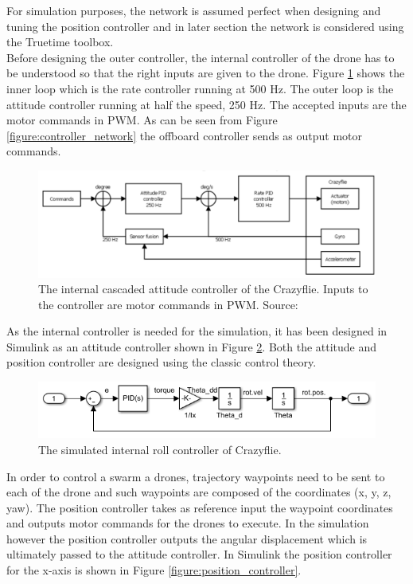 For simulation purposes, the network is assumed perfect when designing and tuning the position controller and in later section the network is considered using the Truetime toolbox.\\

Before designing the outer controller, the internal controller of the drone has to be understood so that the right inputs are given to the drone. Figure \ref{figure:internal_controller} shows the inner loop which is the rate controller running at 500 Hz. The outer loop is the attitude controller running at half the speed, 250 Hz. The accepted inputs are the motor commands in PWM. As can be seen from Figure \ref{figure:controller_network} the offboard controller sends as output motor commands.

\begin{figure}[H]
\centering
 \includegraphics[width=\textwidth]{Figures/internal_controller.png}
 \caption{The internal cascaded attitude controller of the Crazyflie. Inputs to the controller are motor commands in PWM. Source:\cite{modellingcrazy}}
 \label{figure:internal_controller}
\end{figure}

As the internal controller is needed for the simulation, it has been designed in Simulink as an attitude controller shown in Figure \ref{figure:attitude_controller}. Both the attitude and position controller are designed using the classic control theory.

\begin{figure}[H]
\centering
 \includegraphics[width=\textwidth]{Figures/attitude_controller.png}
 \caption{The simulated internal roll controller of Crazyflie.}
 \label{figure:attitude_controller}
\end{figure}

In order to control a swarm a drones, trajectory waypoints need to be sent to each of the drone and such waypoints are composed of the coordinates (x, y, z, yaw). The position controller takes as reference input the waypoint coordinates and outputs motor commands for the drones to execute. In the simulation however the position controller outputs the angular displacement which is ultimately passed to the attitude controller. In Simulink the position controller for the x-axis is shown in Figure \ref{figure:position_controller}.

